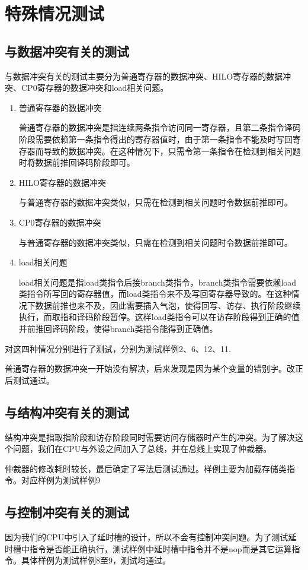 \section{特殊情况测试}
\subsection{与数据冲突有关的测试}

与数据冲突有关的测试主要分为普通寄存器的数据冲突、HILO寄存器的数据冲突、CP0寄存器的数据冲突和load相关问题。

\begin{enumerate}

\item 普通寄存器的数据冲突

普通寄存器的数据冲突是指连续两条指令访问同一寄存器，且第二条指令译码阶段需要依赖第一条指令得出的寄存器值时，由于第一条指令不能及时写回寄存器而导致的数据冲突。在这种情况下，只需令第一条指令在检测到相关问题时将数据前推回译码阶段即可。

\item HILO寄存器的数据冲突

与普通寄存器的数据冲突类似，只需在检测到相关问题时令数据前推即可。

\item CP0寄存器的数据冲突

与普通寄存器的数据冲突类似，只需在检测到相关问题时令数据前推即可。

\item load相关问题

load相关问题是指load类指令后接branch类指令，branch类指令需要依赖load类指令所写回的寄存器值，而load类指令来不及写回寄存器导致的。在这种情况下数据前推也来不及，因此需要插入气泡，使得回写、访存、执行阶段继续执行，而取指和译码阶段暂停。这样load类指令可以在访存阶段得到正确的值并前推回译码阶段，使得branch类指令能得到正确值。

\end{enumerate}

对这四种情况分别进行了测试，分别为测试样例2、6、12、11.

普通寄存器的数据冲突一开始没有解决，后来发现是因为某个变量的错别字。改正后测试通过。

\subsection{与结构冲突有关的测试}

结构冲突是指取指阶段和访存阶段同时需要访问存储器时产生的冲突。为了解决这个问题，我们在CPU与外设之间加入了总线，并在总线上实现了仲裁器。

仲裁器的修改耗时较长，最后确定了写法后测试通过。样例主要为加载存储类指令。对应样例为测试样例9

\subsection{与控制冲突有关的测试}

因为我们的CPU中引入了延时槽的设计，所以不会有控制冲突问题。为了测试延时槽中指令是否能正确执行，测试样例中延时槽中指令并不是nop而是其它运算指令。具体样例为测试样例8至9，测试均通过。
